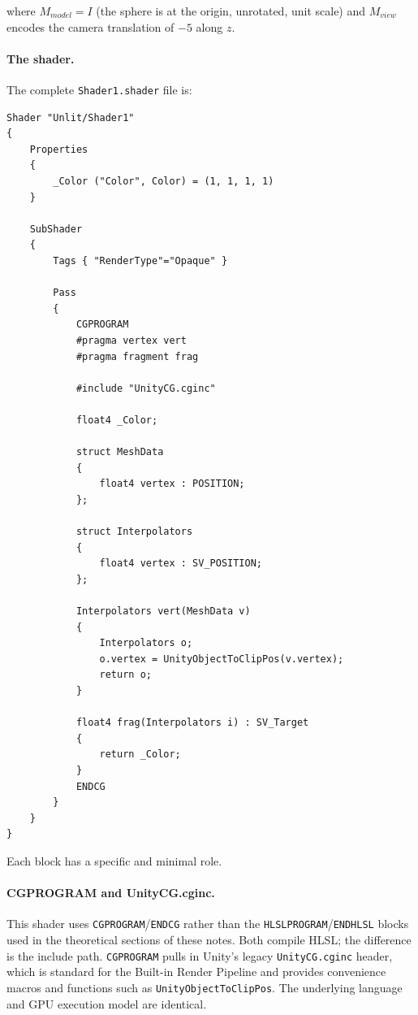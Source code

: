 \documentclass[11pt]{article}
\begin{document}
where $M_{model} = I$ (the sphere is at the origin, unrotated, unit scale) and $M_{view}$ encodes the camera translation of $-5$ along $z$.

\paragraph{The shader.}

The complete \texttt{Shader1.shader} file is:

\begin{lstlisting}
Shader "Unlit/Shader1"
{
    Properties
    {
        _Color ("Color", Color) = (1, 1, 1, 1)
    }

    SubShader
    {
        Tags { "RenderType"="Opaque" }

        Pass
        {
            CGPROGRAM
            #pragma vertex vert
            #pragma fragment frag

            #include "UnityCG.cginc"

            float4 _Color;

            struct MeshData
            {
                float4 vertex : POSITION;
            };

            struct Interpolators
            {
                float4 vertex : SV_POSITION;
            };

            Interpolators vert(MeshData v)
            {
                Interpolators o;
                o.vertex = UnityObjectToClipPos(v.vertex);
                return o;
            }

            float4 frag(Interpolators i) : SV_Target
            {
                return _Color;
            }
            ENDCG
        }
    }
}
\end{lstlisting}

Each block has a specific and minimal role.

\paragraph{CGPROGRAM and UnityCG.cginc.}

This shader uses \texttt{CGPROGRAM}/\texttt{ENDCG} rather than the \texttt{HLSLPROGRAM}/\texttt{ENDHLSL} blocks used in the theoretical sections of these notes. Both compile HLSL; the difference is the include path. \texttt{CGPROGRAM} pulls in Unity's legacy \texttt{UnityCG.cginc} header, which is standard for the Built-in Render Pipeline and provides convenience macros and functions such as \texttt{UnityObjectToClipPos}. The underlying language and GPU execution model are identical.
\end{document}
